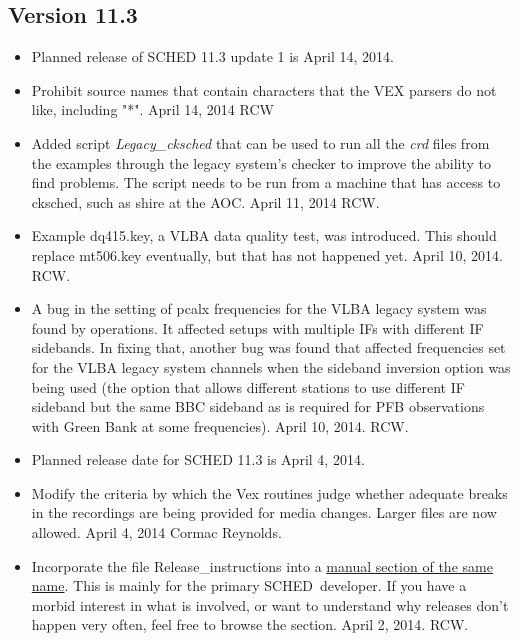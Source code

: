 \documentclass{report}
\newcommand{\schedb}{{\sc SCHED~}}
\begin{document}
\subsection{\label{SSEC:VER_11.3}Version 11.3}

\begin{itemize}

\item Planned release of SCHED 11.3 update 1 is April 14, 2014.

\item Prohibit source names that contain characters that the VEX
parsers do not like, including "*".  April 14, 2014  RCW

\item Added script {\sl Legacy\_cksched} that can be used to run all
the {\sl crd} files from the examples through the legacy system's
checker to improve the ability to find problems.  The script needs
to be run from a machine that has access to cksched, such as shire
at the AOC.  April 11, 2014 RCW.

\item Example dq415.key, a VLBA data quality test, was introduced.
This should replace mt506.key eventually, but that has not happened
yet. April 10, 2014.  RCW.

\item A bug in the setting of pcalx frequencies for the VLBA legacy
system was found by operations.  It affected setups with multiple IFs
with different IF sidebands.  In fixing that, another bug was found
that affected frequencies set for the VLBA legacy system channels when
the sideband inversion option was being used (the option that allows
different stations to use different IF sideband but the same BBC
sideband as is required for PFB observations with Green Bank at some
frequencies).  April 10, 2014.  RCW.

\item Planned release date for SCHED 11.3 is April 4, 2014.

\item Modify the criteria by which the Vex routines judge whether 
adequate breaks in the recordings are being provided for media changes.
Larger files are now allowed.  April 4, 2014  Cormac Reynolds.

\item Incorporate the file Release\_instructions into a
{\hyperref[SEC:RELEASE]{manual section of the same name}}.  This is mainly
for the primary \schedb developer.  If you have a morbid interest in 
what is involved, or want to understand why releases don't happen very
often, feel free to browse the section.  April 2, 2014.  RCW.


\end{itemize}
\end{document}

